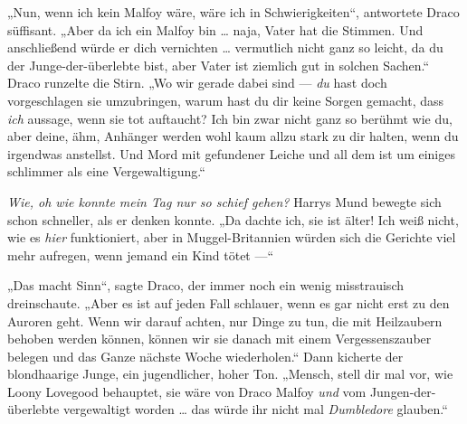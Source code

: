 „Nun, wenn ich kein Malfoy wäre, wäre ich in Schwierigkeiten“, antwortete Draco süffisant.
„Aber da ich ein Malfoy bin … naja, Vater hat die Stimmen. Und anschließend würde er dich vernichten … vermutlich nicht ganz so leicht, da du der Junge-der-überlebte bist, aber Vater ist ziemlich gut in solchen Sachen.“ Draco runzelte die Stirn.
„Wo wir gerade dabei sind — \emph{du} hast doch vorgeschlagen sie umzubringen, warum hast du dir keine Sorgen gemacht, dass \emph{ich} aussage, wenn sie tot auftaucht? Ich bin zwar nicht ganz so berühmt wie du, aber deine, ähm, Anhänger werden wohl kaum allzu stark zu dir halten, wenn du irgendwas anstellst. Und Mord mit gefundener Leiche und all dem ist um einiges schlimmer als eine Vergewaltigung.“

\emph{Wie, oh wie konnte mein Tag nur so schief gehen?} Harrys Mund bewegte sich schon schneller, als er denken konnte.
„Da dachte ich, sie ist älter! Ich weiß nicht, wie es \emph{hier} funktioniert, aber in Muggel-Britannien würden sich die Gerichte viel mehr aufregen, wenn jemand ein Kind tötet —“

„Das macht Sinn“, sagte Draco, der immer noch ein wenig misstrauisch dreinschaute.
„Aber es ist auf jeden Fall schlauer, wenn es gar nicht erst zu den Auroren geht. Wenn wir darauf achten, nur Dinge zu tun, die mit Heilzaubern behoben werden können, können wir sie danach mit einem Vergessenszauber belegen und das Ganze nächste Woche wiederholen.“ Dann kicherte der blondhaarige Junge, ein jugendlicher, hoher Ton.
„Mensch, stell dir mal vor, wie Loony Lovegood behauptet, sie wäre von Draco Malfoy \emph{und} vom Jungen-der-überlebte vergewaltigt worden … das würde ihr nicht mal \emph{Dumbledore} glauben.“

